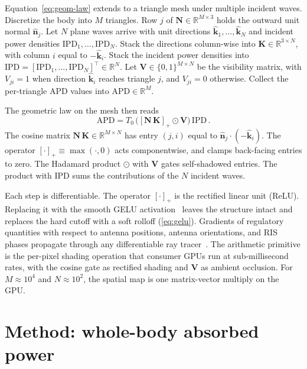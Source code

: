 \documentclass[journal,twocolumn,10pt]{IEEEtran}
\newcommand{\khat}{\hat{\bm{k}}}
\newcommand{\nhat}{\hat{\bm{n}}}
\newcommand{\IPD}{\mathrm{IPD}}
\newcommand{\pospart}[1]{\left[#1\right]_{+}}
\begin{document}
Equation~\eqref{eq:geom-law} extends to a triangle mesh under
multiple incident waves. Discretize the body into $M$ triangles. Row $j$ of
$\mathbf{N} \in \mathbb{R}^{M\times 3}$ holds the outward unit
normal $\nhat_j$. Let $N$ plane waves arrive with unit directions
$\khat_1, \ldots, \khat_N$ and incident power densities
$\IPD_1, \ldots, \IPD_N$.
Stack the directions column-wise into
$\mathbf{K} \in \mathbb{R}^{3\times N}$, with column $i$ equal to
$-\khat_i$. Stack the incident power densities into
$\bm{\mathrm{IPD}} = [\IPD_1,\ldots,\IPD_N]^\top \in \mathbb{R}^N$. Let
$\mathbf{V} \in \{0,1\}^{M\times N}$ be the visibility matrix, with
$V_{ji} = 1$ when direction $\khat_i$ reaches triangle $j$, and
$V_{ji} = 0$ otherwise. Collect the per-triangle APD values into
$\bm{\mathrm{APD}} \in \mathbb{R}^{M}$.

The geometric law on the mesh then reads
\begin{equation}\label{eq:mat-multi}
  \bm{\mathrm{APD}} = T_0\,\bigl(\pospart{\mathbf{N}\,\mathbf{K}}
  \odot \mathbf{V}\bigr)\,\bm{\mathrm{IPD}}\, .
\end{equation}
The cosine matrix $\mathbf{N}\,\mathbf{K} \in \mathbb{R}^{M\times N}$
has entry $(j,i)$ equal to $\nhat_j\cdot(-\khat_i)$. The operator
$\pospart{\cdot} \equiv \max(\cdot,0)$ acts componentwise, and clamps
back-facing entries to zero. The Hadamard product $\odot$ with
$\mathbf{V}$ gates self-shadowed entries. The product with
$\bm{\mathrm{IPD}}$ sums the contributions of the $N$ incident waves.

Each step is differentiable. The operator $\pospart{\cdot}$ is the
rectified linear unit (ReLU). Replacing it with the smooth
\gls{GELU} activation~\cite{Hendrycks2016} leaves the structure
intact and replaces the hard cutoff with a soft rolloff
(\cref{eq:gelu}). Gradients of regulatory quantities with respect to
antenna positions, antenna orientations, and RIS phases propagate
through any differentiable ray tracer~\cite{SionnaRT}. The arithmetic
primitive is the per-pixel shading operation that consumer GPUs run
at sub-millisecond rates, with the cosine gate as rectified shading
and $\mathbf{V}$ as ambient occlusion. For $M \approx 10^4$ and
$N \approx 10^2$, the spatial map is one matrix-vector multiply on
the GPU.

\section{Method: whole-body absorbed power}\label{sec:cauchy}
\end{document}
